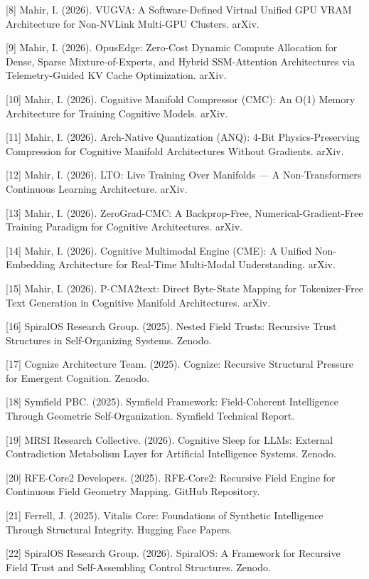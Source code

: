 \documentclass[
  11pt,
  a4paper,
]{article}
\begin{document}
{[}8{]} Mahir, I. (2026). VUGVA: A Software-Defined Virtual Unified GPU
VRAM Architecture for Non-NVLink Multi-GPU Clusters. arXiv.

{[}9{]} Mahir, I. (2026). OpusEdge: Zero-Cost Dynamic Compute Allocation
for Dense, Sparse Mixture-of-Experts, and Hybrid SSM-Attention
Architectures via Telemetry-Guided KV Cache Optimization. arXiv.

{[}10{]} Mahir, I. (2026). Cognitive Manifold Compressor (CMC): An O(1)
Memory Architecture for Training Cognitive Models. arXiv.

{[}11{]} Mahir, I. (2026). Arch-Native Quantization (ANQ): 4-Bit
Physics-Preserving Compression for Cognitive Manifold Architectures
Without Gradients. arXiv.

{[}12{]} Mahir, I. (2026). LTO: Live Training Over Manifolds --- A
Non-Transformers Continuous Learning Architecture. arXiv.

{[}13{]} Mahir, I. (2026). ZeroGrad-CMC: A Backprop-Free,
Numerical-Gradient-Free Training Paradigm for Cognitive Architectures.
arXiv.

{[}14{]} Mahir, I. (2026). Cognitive Multimodal Engine (CME): A Unified
Non-Embedding Architecture for Real-Time Multi-Modal Understanding.
arXiv.

{[}15{]} Mahir, I. (2026). P-CMA2text: Direct Byte-State Mapping for
Tokenizer-Free Text Generation in Cognitive Manifold Architectures.
arXiv.

{[}16{]} SpiralOS Research Group. (2025). Nested Field Trusts: Recursive
Trust Structures in Self-Organizing Systems. Zenodo.

{[}17{]} Cognize Architecture Team. (2025). Cognize: Recursive
Structural Pressure for Emergent Cognition. Zenodo.

{[}18{]} Symfield PBC. (2025). Symfield Framework: Field-Coherent
Intelligence Through Geometric Self-Organization. Symfield Technical
Report.

{[}19{]} MRSI Research Collective. (2026). Cognitive Sleep for LLMs:
External Contradiction Metabolism Layer for Artificial Intelligence
Systems. Zenodo.

{[}20{]} RFE-Core2 Developers. (2025). RFE-Core2: Recursive Field Engine
for Continuous Field Geometry Mapping. GitHub Repository.

{[}21{]} Ferrell, J. (2025). Vitalis Core: Foundations of Synthetic
Intelligence Through Structural Integrity. Hugging Face Papers.

{[}22{]} SpiralOS Research Group. (2026). SpiralOS: A Framework for
Recursive Field Trust and Self-Assembling Control Structures. Zenodo.
\end{document}
